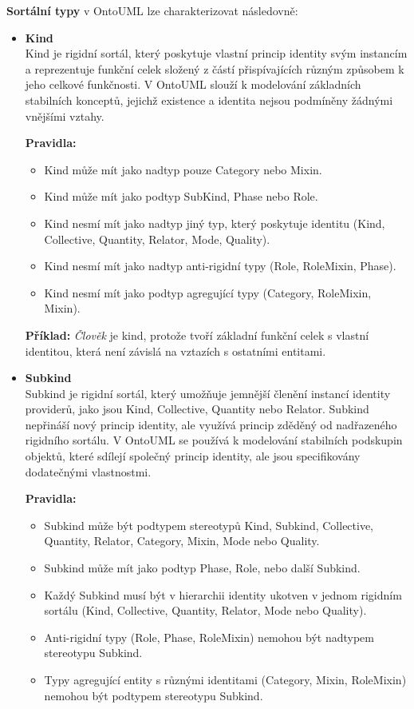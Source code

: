 \noindent \textbf{Sortální typy} v OntoUML lze charakterizovat následovně:
\begin{itemize}
  \item \textbf{Kind} \\
  Kind je rigidní sortál, který poskytuje vlastní princip identity svým instancím a reprezentuje funkční celek složený z částí přispívajících různým způsobem k jeho celkové funkčnosti. V OntoUML slouží k modelování základních stabilních konceptů, jejichž existence a identita nejsou podmíněny žádnými vnějšími vztahy. \cite{KOM_prezentace2,ontouml_class_stereotypes}

  \textbf{Pravidla:}
  \begin{itemize}
    \item Kind může mít jako nadtyp pouze Category nebo Mixin.
    \item Kind může mít jako podtyp SubKind, Phase nebo Role.
    \item Kind nesmí mít jako nadtyp jiný typ, který poskytuje identitu (Kind, Collective, Quantity, Relator, Mode, Quality).
    \item Kind nesmí mít jako nadtyp anti-rigidní typy (Role, RoleMixin, Phase).
    \item Kind nesmí mít jako podtyp agregující typy (Category, RoleMixin, Mixin). \cite{ontouml_class_stereotypes}
  \end{itemize}

  \textbf{Příklad:} \textit{Člověk} je kind, protože tvoří základní funkční celek s vlastní identitou, která není závislá na vztazích s ostatními entitami.


  \item \textbf{Subkind} \\
  Subkind je rigidní sortál, který umožňuje jemnější členění instancí identity providerů, jako jsou Kind, Collective, Quantity nebo Relator. Subkind nepřináší nový princip identity, ale využívá princip zděděný od nadřazeného rigidního sortálu. V OntoUML se používá k modelování stabilních podskupin objektů, které sdílejí společný princip identity, ale jsou specifikovány dodatečnými vlastnostmi. \cite{KOM_prezentace2,ontouml_class_stereotypes}

  \textbf{Pravidla:}
  \begin{itemize}
    \item Subkind může být podtypem stereotypů Kind, Subkind, Collective, Quantity, Relator, Category, Mixin, Mode nebo Quality.
    \item Subkind může mít jako podtyp Phase, Role, nebo další Subkind.
    \item Každý Subkind musí být v hierarchii identity ukotven v jednom rigidním sortálu (Kind, Collective, Quantity, Relator, Mode nebo Quality).
    \item Anti-rigidní typy (Role, Phase, RoleMixin) nemohou být nadtypem stereotypu Subkind.
    \item Typy agregující entity s různými identitami (Category, Mixin, RoleMixin) nemohou být podtypem stereotypu Subkind. \cite{ontouml_class_stereotypes}
  \end{itemize}


\end{itemize}

